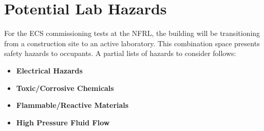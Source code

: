 \documentclass[12pt,oneside]{book}
\begin{document}
\section{Potential Lab Hazards}
\label{lab_hazards}
For the ECS commissioning tests at the NFRL, the building will be transitioning from a construction site to an active laboratory. This combination space presents safety hazards to occupants. A partial lists of hazards to consider follows:
\begin{itemize}
\item {\bf Electrical Hazards}
\item {\bf Toxic/Corrosive Chemicals}
\item {\bf Flammable/Reactive Materials}
\item {\bf High Pressure Fluid Flow}

\end{itemize}
\end{document}
